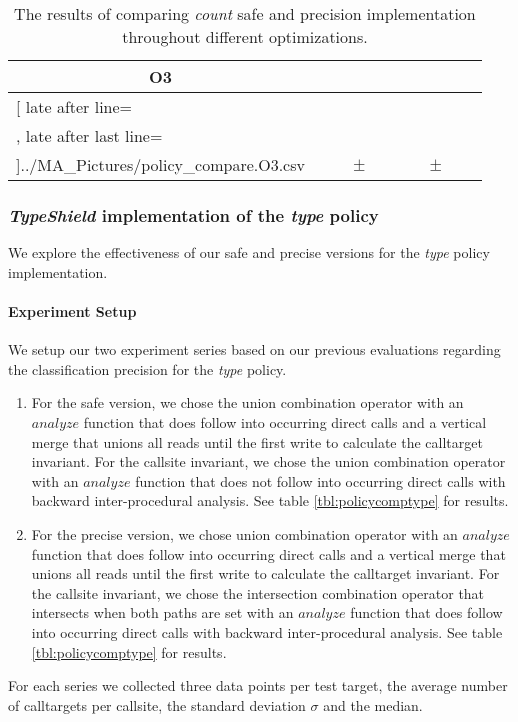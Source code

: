 \begin{table}[!htbp]
{\begin{tabular}{l|c|rcl|c|rcl|c}
\multicolumn{1}{c}{\bfseries O3}
	\\\midrule
	\csvreader[ late after line=\\, late after last line=\\\bottomrule]{../MA_Pictures/policy_compare.O3.csv}{
}
	{\csvcolii  &  \csvcoliii & \csvcoliv & $\pm$ & \csvcolv & \csvcolvi & \csvcolvii & $\pm$ & \csvcolviii& \csvcolix}%

    	\end{tabular}
}
		\caption {The results of comparing \textit{count} safe and precision implementation throughout different optimizations.}
		\label{tbl:policycompcount}
\end{table}

\newpage

\subsubsection{\textit{TypeShield} implementation of the \textit{type} policy}
\label{subsection:typeshieldvslimitcount}
We explore the effectiveness of our safe and precise versions for the \textit{type} policy implementation.

\paragraph{Experiment Setup} We setup our two experiment series based on our previous evaluations regarding the classification precision for the \textit{type} policy.
\begin{enumerate}
\item For the safe version, we chose the union combination operator with an $analyze$ function that does follow into occurring direct calls  and a vertical merge that unions all reads until the first write to calculate the calltarget invariant. For the callsite invariant, we chose the union combination operator with an $analyze$ function that does not follow into occurring direct calls  with backward inter-procedural analysis.  See table \ref{tbl:policycomptype} for results. 
\item For the precise version, we chose union combination operator with an $analyze$ function that does follow into occurring direct calls  and a vertical merge that unions all reads until the first write to calculate the calltarget invariant. For the callsite invariant, we chose the intersection combination operator that intersects when both paths are set with an $analyze$ function that does follow into occurring direct calls with backward inter-procedural analysis. See table \ref{tbl:policycomptype} for results. 
\end{enumerate}
For each series we collected three data points per test target, the average number of calltargets per callsite, the standard deviation $\sigma$ and the median.

